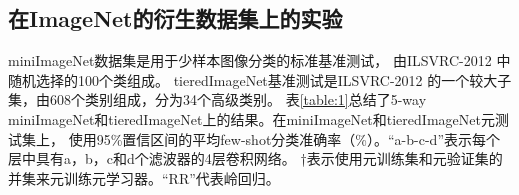 


\subsection{在ImageNet的衍生数据集上的实验}

miniImageNet数据集是用于少样本图像分类的标准基准测试，
由ILSVRC-2012 中随机选择的100个类组成。
tieredImageNet基准测试是ILSVRC-2012 的一个较大子集，由608个类别组成，分为34个高级类别。
表\ref{table:1}总结了5-way miniImageNet和tieredImageNet上的结果。在miniImageNet和tieredImageNet元测试集上，
使用95\%置信区间的平均few-shot分类准确率（\%）。“a-b-c-d”表示每个层中具有a，b，c和d个滤波器的4层卷积网络。
†表示使用元训练集和元验证集的并集来元训练元学习器。“RR”代表岭回归。
